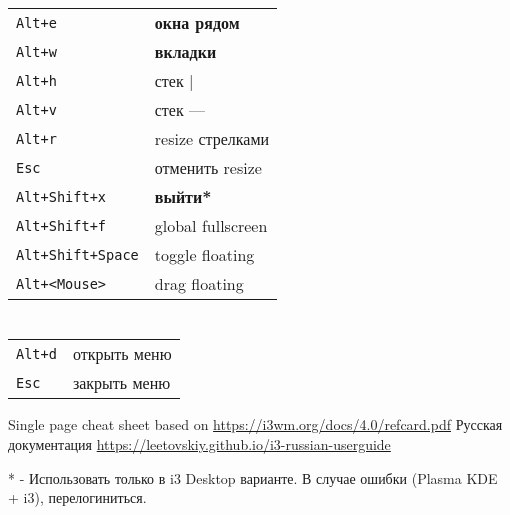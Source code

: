 \begin{multicols}{3}
\section{}
\begin{tabular}{@{}ll@{}}
    \verb!Alt+e! & \textbf{окна рядом} \\
    \verb!Alt+w! & \textbf{вкладки} \\
    \verb!Alt+h! & стек | \\
    \verb!Alt+v! & стек --- \\
    \verb!Alt+r! & resize стрелками \\
	\verb!Esc! & отменить resize \\
    \verb!Alt+Shift+x! & \textbf{выйти*} \\
    \verb!Alt+Shift+f! & global fullscreen \\
    \verb!Alt+Shift+Space! & toggle floating \\
    \verb!Alt+<Mouse>! & drag floating \\
\end{tabular}

\section{}
\begin{tabular}{@{}ll@{}}
	\verb!Alt+d! & открыть меню \\
	\verb!Esc! & закрыть меню \\
\end{tabular}

\vspace{.5in}
Single page cheat sheet based on \url{https://i3wm.org/docs/4.0/refcard.pdf}
Русская документация \url{https://leetovskiy.github.io/i3-russian-userguide}

\end{multicols}

* - Использовать только в i3 Desktop варианте. В случае ошибки (Plasma KDE + i3), перелогиниться.


